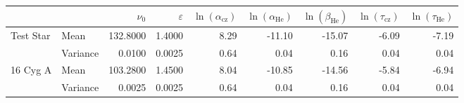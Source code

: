 \begin{tabular}{llrrrrrrr}
\toprule
 &  & $\nu_0$ & $\varepsilon$ & $\ln(\alpha_\mathrm{cz})$ & $\ln(\alpha_\mathrm{He})$ & $\ln(\beta_\mathrm{He})$ & $\ln(\tau_\mathrm{cz})$ & $\ln(\tau_\mathrm{He})$ \\
\midrule
\multirow[c]{2}{*}{Test Star} & Mean & 132.8000 & 1.4000 & 8.29 & -11.10 & -15.07 & -6.09 & -7.19 \\
 & Variance & 0.0100 & 0.0025 & 0.64 & 0.04 & 0.16 & 0.04 & 0.04 \\
\multirow[c]{2}{*}{16 Cyg A} & Mean & 103.2800 & 1.4500 & 8.04 & -10.85 & -14.56 & -5.84 & -6.94 \\
 & Variance & 0.0025 & 0.0025 & 0.64 & 0.04 & 0.16 & 0.04 & 0.04 \\
\bottomrule
\end{tabular}

